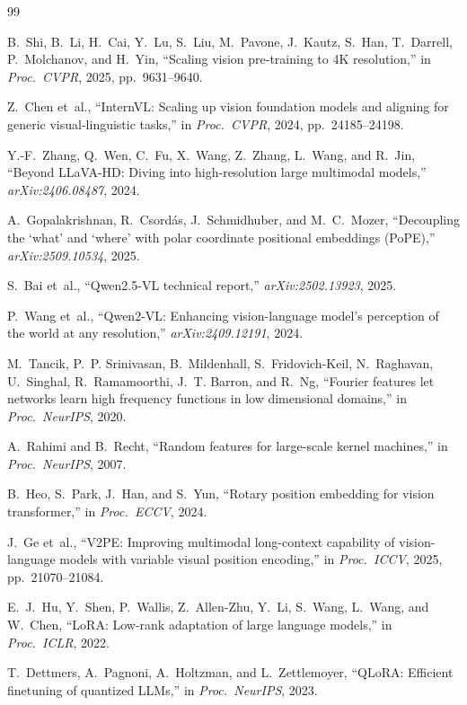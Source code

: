 \documentclass{article}
\begin{document}

{\small
\begin{thebibliography}{99}

B.~Shi, B.~Li, H.~Cai, Y.~Lu, S.~Liu, M.~Pavone, J.~Kautz,
S.~Han, T.~Darrell, P.~Molchanov, and H.~Yin,
``Scaling vision pre-training to 4K resolution,''
in \emph{Proc.\ CVPR}, 2025, pp.~9631--9640.

Z.~Chen et~al.,
``InternVL: Scaling up vision foundation models and aligning
for generic visual-linguistic tasks,''
in \emph{Proc.\ CVPR}, 2024, pp.~24185--24198.

Y.-F.~Zhang, Q.~Wen, C.~Fu, X.~Wang, Z.~Zhang, L.~Wang, and
R.~Jin,
``Beyond LLaVA-HD: Diving into high-resolution large multimodal
models,''
\emph{arXiv:2406.08487}, 2024.

A.~Gopalakrishnan, R.~Csord\'{a}s, J.~Schmidhuber, and
M.~C.~Mozer,
``Decoupling the `what' and `where' with polar coordinate
positional embeddings (PoPE),''
\emph{arXiv:2509.10534}, 2025.

S.~Bai et~al.,
``Qwen2.5-VL technical report,''
\emph{arXiv:2502.13923}, 2025.

P.~Wang et~al.,
``Qwen2-VL: Enhancing vision-language model's perception of
the world at any resolution,''
\emph{arXiv:2409.12191}, 2024.

M.~Tancik, P.~P. Srinivasan, B.~Mildenhall, S.~Fridovich-Keil,
N.~Raghavan, U.~Singhal, R.~Ramamoorthi, J.~T. Barron, and R.~Ng,
``Fourier features let networks learn high frequency functions
in low dimensional domains,''
in \emph{Proc.\ NeurIPS}, 2020.

A.~Rahimi and B.~Recht,
``Random features for large-scale kernel machines,''
in \emph{Proc.\ NeurIPS}, 2007.

B.~Heo, S.~Park, J.~Han, and S.~Yun,
``Rotary position embedding for vision transformer,''
in \emph{Proc.\ ECCV}, 2024.

J.~Ge et~al.,
``V2PE: Improving multimodal long-context capability of
vision-language models with variable visual position encoding,''
in \emph{Proc.\ ICCV}, 2025, pp.~21070--21084.

E.~J.~Hu, Y.~Shen, P.~Wallis, Z.~Allen-Zhu, Y.~Li, S.~Wang,
L.~Wang, and W.~Chen,
``LoRA: Low-rank adaptation of large language models,''
in \emph{Proc.\ ICLR}, 2022.

T.~Dettmers, A.~Pagnoni, A.~Holtzman, and L.~Zettlemoyer,
``QLoRA: Efficient finetuning of quantized LLMs,''
in \emph{Proc.\ NeurIPS}, 2023.


\end{thebibliography}}
\end{document}
